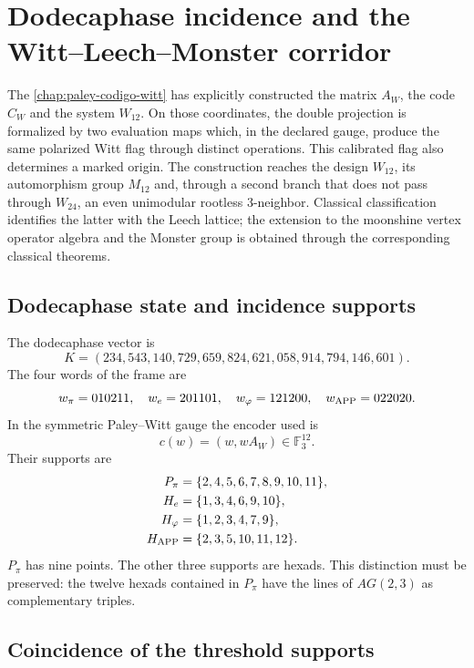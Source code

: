 \chapter{Dodecaphase incidence and the Witt--Leech--Monster corridor}
\label{chap:bandera-excepcional-acumulativa}

The \cref{chap:paley-codigo-witt} has explicitly constructed the matrix
\(A_W\), the code \(C_W\) and the system \(W_{12}\). On those coordinates,
the double projection is formalized by two evaluation maps which,
in the declared gauge, produce the same polarized Witt flag through distinct
operations. This calibrated flag also determines a marked origin. The
construction reaches the design \(W_{12}\), its automorphism group
\(M_{12}\) and, through a second branch that does not pass through \(W_{24}\), an
even unimodular rootless 3-neighbor. Classical classification identifies the
latter with the Leech lattice; the extension to the moonshine vertex
operator algebra and the Monster group is obtained through the corresponding classical
theorems.

\section{Dodecaphase state and incidence supports}

The dodecaphase vector is
\[
K=(234,543,140,729,659,824,621,058,914,794,146,601).
\]
The four words of the frame are
\[
w_\pi=010211,
\quad
w_e=201101,
\quad
w_\varphi=121200,
\quad
w_{\rm APP}=022020.
\]
In the symmetric Paley--Witt gauge the encoder used is
\[
c(w)=(w,wA_W)\in\mathbb F_3^{12}.
\]
Their supports are
\[
\begin{aligned}
P_\pi&=\{2,4,5,6,7,8,9,10,11\},\\
H_e&=\{1,3,4,6,9,10\},\\
H_\varphi&=\{1,2,3,4,7,9\},\\
H_{\rm APP}&=\{2,3,5,10,11,12\}.
\end{aligned}
\]
\(P_\pi\) has nine points. The other three supports are hexads. This
distinction must be preserved: the twelve hexads contained in \(P_\pi\) have
the lines of \(AG(2,3)\) as complementary triples.

\section{Coincidence of the threshold supports}

